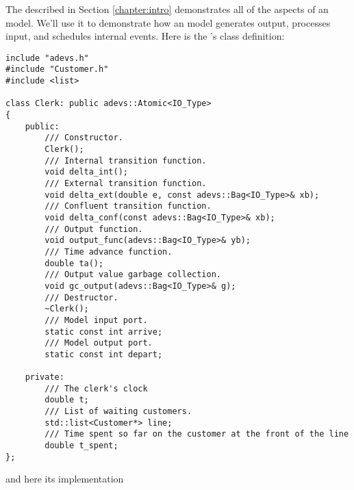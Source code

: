 The  described in Section \ref{chapter:intro} demonstrates all of the aspects of an  model. We'll use it to demonstrate how an  model generates output, processes input, and schedules internal events. Here is the 's class definition:
\begin{verbatim}
include "adevs.h"
#include "Customer.h"
#include <list>

class Clerk: public adevs::Atomic<IO_Type> 
{
    public:
        /// Constructor.
        Clerk();
        /// Internal transition function.
        void delta_int();
        /// External transition function.
        void delta_ext(double e, const adevs::Bag<IO_Type>& xb);
        /// Confluent transition function.
        void delta_conf(const adevs::Bag<IO_Type>& xb);
        /// Output function.  
        void output_func(adevs::Bag<IO_Type>& yb);
        /// Time advance function.
        double ta();
        /// Output value garbage collection.
        void gc_output(adevs::Bag<IO_Type>& g);
        /// Destructor.
        ~Clerk();
        /// Model input port.
        static const int arrive;
        /// Model output port.
        static const int depart;

    private:
        /// The clerk's clock
        double t;
        /// List of waiting customers.
        std::list<Customer*> line;
        /// Time spent so far on the customer at the front of the line
        double t_spent;
};
\end{verbatim}
and here its implementation
